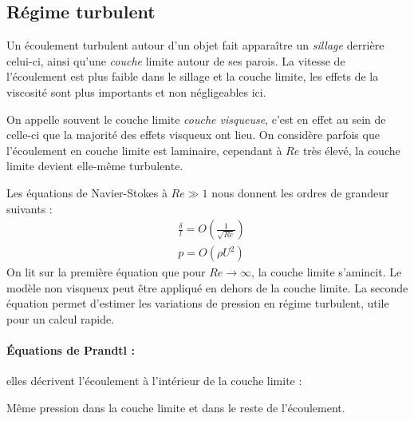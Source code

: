 \subsection{Régime turbulent}
Un écoulement turbulent autour d'un objet fait apparaître un \textit{sillage} derrière celui-ci, ainsi qu'une \textit{couche} limite autour de ses parois. La vitesse de l'écoulement est plus faible dans le sillage et la couche limite, les effets de la viscosité sont plus importants et non négligeables ici.

On appelle souvent le couche limite \textit{couche visqueuse}, c'est en effet au sein de celle-ci que la majorité des effets visqueux ont lieu. On considère parfois que l'écoulement en couche limite est laminaire, cependant à $Re$ très élevé, la couche limite devient elle-même turbulente.

Les équations de Navier-Stokes à $Re \gg 1$ nous donnent les ordres de grandeur suivants :
%
\begin{align}
    & \frac {\delta}{l} = O \left( \frac{1}{\sqrt{Re}} \right) \\
    & p = O \left( \rho U^2 \right)
\end{align}
%
On lit sur la première équation que pour $Re \to \infty$, la couche limite s'amincit. Le modèle non visqueux peut être appliqué en dehors de la couche limite. La seconde équation permet d'estimer les variations de pression en régime turbulent, utile pour un calcul rapide.

\paragraph{Équations de Prandtl :}elles décrivent l'écoulement à l'intérieur de la couche limite :

Même pression dans la couche limite et dans le reste de l'écoulement.


